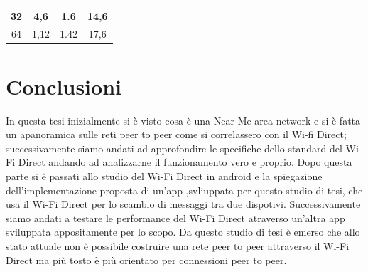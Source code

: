 \begin{table}
\begin{tabular}{|c|c|c|c|}
    32                                                            & 4,6                                                                       & 1.6                                                                                & 14,6                                                                                          \\ \hline
    64                                                            & 1,12                                                                      & 1.42                                                                               & 17,6                                                                                          \\ \hline
    \end{tabular}
    \end{table}

    \chapter*{Conclusioni}
    In questa tesi inizialmente si è visto cosa è una Near-Me area network e
    si è fatta un apanoramica sulle reti peer to peer come si correlassero
    con il Wi-fi Direct; successivamente siamo andati ad approfondire le specifiche
    dello standard del Wi-Fi Direct andando ad analizzarne il
     funzionamento vero e proprio.
    Dopo questa parte si è passati allo studio del Wi-Fi Direct
    in android e la spiegazione dell'implementazione
    proposta di un'app ,svliuppata per questo studio di tesi,
    che usa il Wi-Fi Direct per lo scambio di messaggi 
    tra due dispotivi.
    Successivamente siamo andati a testare le performance del Wi-Fi Direct
    atraverso un'altra app sviluppata appositamente per lo scopo.
    Da questo studio di tesi è emerso che allo stato attuale 
    non è possibile costruire una rete peer to peer
    attraverso il Wi-Fi Direct ma più tosto è più orientato
    per connessioni peer to peer.





